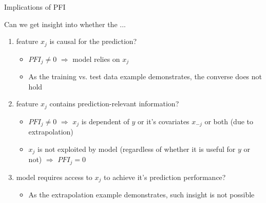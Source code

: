 \documentclass[11pt,compress,t,notes=noshow, aspectratio=169, xcolor=table]{beamer}
\begin{document}
\begin{frame}{Implications of PFI}

Can we get insight into whether the ...

\begin{enumerate}
    \item<1-> feature $x_j$ is causal for the prediction?
    \begin{itemize}
      \item $PFI_j \neq 0$ $\Rightarrow$ model relies on $x_j$
      \item As the training vs. test data example demonstrates, the converse does not hold
    \end{itemize}
    \item<2-> feature $x_j$ contains prediction-relevant information?
    \begin{itemize}
      \item $PFI_j \neq 0$  $\Rightarrow$ $x_{j}$ is dependent of $y$ or it's covariates $x_{-j}$ or both (due to extrapolation) 
      \item $x_{j}$ is not exploited by model (regardless of whether it is useful for $y$ or not) $\Rightarrow$ $PFI_j = 0$  %
    \end{itemize}
    \item<3-> model requires access to $x_j$ to achieve it's prediction performance?    
    \begin{itemize}
      \item As the extrapolation example demonstrates, such insight is not possible
\end{itemize}
\end{enumerate}
\end{frame}
\end{document}
